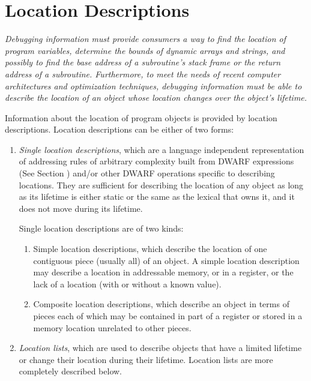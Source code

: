 \section{Location Descriptions}
\label{chap:locationdescriptions}
\textit{Debugging information 
must 
provide consumers a way to find
the location of program variables, determine the bounds
of dynamic arrays and strings, and possibly to find the
base address of a subroutine’s stack frame or the return
address of a subroutine. Furthermore, to meet the needs of
recent computer architectures and optimization techniques,
debugging information must be able to describe the location of
an object whose location changes over the object’s lifetime.}

Information about the location of program objects is provided
by location descriptions. Location descriptions can be either
of two forms:
\begin{enumerate}[1]
\item \textit{Single location descriptions}, 
which 
are 
a language independent representation of
addressing rules of arbitrary complexity built from 
DWARF expressions (See Section ) 
and/or other
DWARF operations specific to describing locations. They are
sufficient for describing the location of any object as long
as its lifetime is either static or the same as the lexical
 that owns it, 
and it does not move during its lifetime.

Single location descriptions are of two kinds:
\begin{enumerate}[a]
\item Simple location descriptions, which describe the location
of one contiguous piece (usually all) of an object. A simple
location description may describe a location in addressable
memory, or in a register, or the lack of a location (with or
without a known value).

\item  Composite location descriptions, which describe an
object in terms of pieces each of which may be contained in
part of a register or stored in a memory location unrelated
to other pieces.

\end{enumerate}
\item \textit{Location lists}, which are used to 
describe
objects that have a limited lifetime or change their location
during their lifetime. Location lists are more completely
described below.

\end{enumerate}

